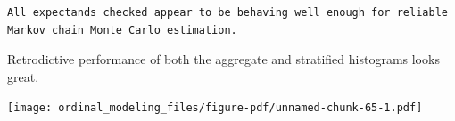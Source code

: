 \documentclass[
  letterpaper,
  DIV=11,
  numbers=noendperiod]{scrartcl}
\newenvironment{Shaded}{\begin{snugshade}}{\end{snugshade}}
\newcommand{\AttributeTok}[1]{\textcolor[rgb]{0.40,0.45,0.13}{#1}}
\newcommand{\DecValTok}[1]{\textcolor[rgb]{0.68,0.00,0.00}{#1}}
\newcommand{\FloatTok}[1]{\textcolor[rgb]{0.68,0.00,0.00}{#1}}
\newcommand{\FunctionTok}[1]{\textcolor[rgb]{0.28,0.35,0.67}{#1}}
\newcommand{\NormalTok}[1]{\textcolor[rgb]{0.00,0.23,0.31}{#1}}
\newcommand{\SpecialCharTok}[1]{\textcolor[rgb]{0.37,0.37,0.37}{#1}}
\newcommand{\StringTok}[1]{\textcolor[rgb]{0.13,0.47,0.30}{#1}}
\begin{document}
\begin{verbatim}
All expectands checked appear to be behaving well enough for reliable
Markov chain Monte Carlo estimation.
\end{verbatim}

Retrodictive performance of both the aggregate and stratified histograms
looks great.

\begin{Shaded}
\end{Shaded}

\texttt{[image: ordinal\_modeling\_files/figure-pdf/unnamed-chunk-65-1.pdf]}
\end{document}
